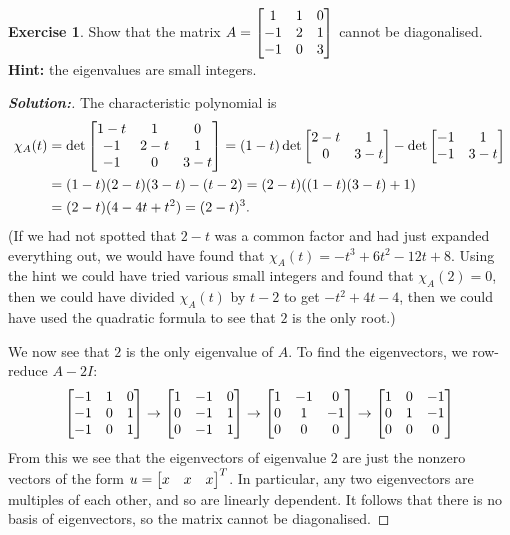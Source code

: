\documentclass[a4paper]{amsart}
\theoremstyle{definition}
\newtheorem{exercise}{Exercise}
\newenvironment{solution}{\begin{proof}[\textbf{Solution:}] \vphantom{u}}{\end{proof}}
\begin{document}
\begin{exercise}\label{ex-diagonal-vi}
 Show that the matrix $A=\left[\begin{matrix} 1&1&0\\ -1&2&1\\ -1&0&3\end{matrix}\right]$ cannot be
 diagonalised.\\
 \textbf{Hint:} the eigenvalues are small integers.
\end{exercise}
\begin{solution}
 The characteristic polynomial is
 \begin{align*}
  \chi_A(t) &= 
   \det\left[\begin{matrix} 1-t & 1   & 0 \\
           -1   & 2-t & 1 \\
           -1   & 0   & 3-t \end{matrix}\right] 
   = (1-t) \det\left[\begin{matrix} 2-t&1 \\ 0&3-t \end{matrix}\right] - \det\left[\begin{matrix} -1&1 \\ -1&3-t \end{matrix}\right] \\
   &= (1-t)(2-t)(3-t) - (t-2) 
    = (2-t)((1-t)(3-t)+1) \\
   &= (2-t)(4-4t+t^2) = (2-t)^3.
 \end{align*}
 (If we had not spotted that $2-t$ was a common factor and had just
 expanded everything out, we would have found that
 $\chi_A(t)=-t^3+6t^2-12t+8$.  Using the hint we could have tried
 various small integers and found that $\chi_A(2)=0$, then we could
 have divided $\chi_A(t)$ by $t-2$ to get $-t^2+4t-4$, then we could
 have used the quadratic formula to see that $2$ is the only root.)

 We now see that $2$ is the only eigenvalue of $A$.  To find the
 eigenvectors, we row-reduce $A-2I$:
 \[ \left[\begin{matrix} -1&1&0 \\ -1&0&1 \\ -1&0&1 \end{matrix}\right] 
    \to 
    \left[\begin{matrix} 1&-1&0 \\ 0&-1&1 \\ 0&-1&1 \end{matrix}\right]
    \to
    \left[\begin{matrix} 1&-1&0 \\ 0&1&-1 \\ 0&0&0 \end{matrix}\right]
    \to
    \left[\begin{matrix} 1&0&-1 \\ 0&1&-1 \\ 0&0&0 \end{matrix}\right]
 \]
 From this we see that the eigenvectors of eigenvalue $2$ are just the
 nonzero vectors of the form $u=\left[\begin{matrix} x&x&x\end{matrix}\right]^T$.  In particular, any
 two eigenvectors are multiples of each other, and so are linearly
 dependent.  It follows that there is no basis of eigenvectors, so the
 matrix cannot be diagonalised.
\end{solution}
\end{document}
